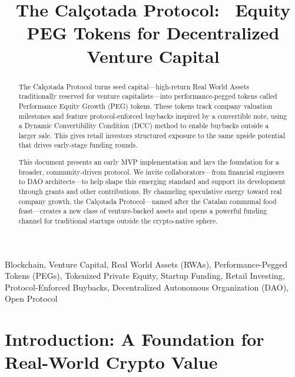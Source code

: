 \documentclass[conference]{IEEEtran}
\begin{document}
\thispagestyle{plain}
\pagestyle{plain}

\title{The Calçotada Protocol: \ Equity PEG Tokens for Decentralized Venture Capital}

\author{
}

\maketitle
\thispagestyle{plain} %

\begin{abstract}
The Calçotada Protocol turns seed capital—high-return Real World Assets traditionally reserved for venture capitalists—into performance-pegged tokens called Performance Equity Growth (PEG) tokens. These tokens track company valuation milestones and feature protocol-enforced buybacks inspired by a convertible note, using a Dynamic Convertibility Condition (DCC) method to enable buybacks outside a larger sale. This gives retail investors structured exposure to the same upside potential that drives early-stage funding rounds.

This document presents an early MVP implementation and lays the foundation for a broader, community-driven protocol. We invite collaborators—from financial engineers to DAO architects—to help shape this emerging standard and support its development through grants and other contributions. By channeling speculative energy toward real company growth, the Calçotada Protocol—named after the Catalan communal food feast—creates a new class of venture-backed assets and opens a powerful funding channel for traditional startups outside the crypto-native sphere.
\end{abstract}
\vspace{1em}

\begin{IEEEkeywords}
Blockchain, Venture Capital, Real World Assets (RWAs), Performance-Pegged Tokens (PEGs), Tokenized Private Equity, Startup Funding, Retail Investing, Protocol-Enforced Buybacks, Decentralized Autonomous Organization (DAO), Open Protocol
\end{IEEEkeywords}

\section{Introduction: A Foundation for Real-World Crypto Value}
\end{document}
